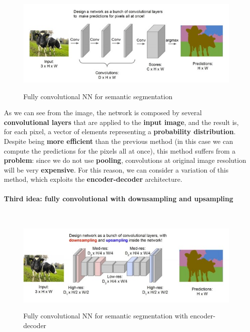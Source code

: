 \begin{figure}[h!]
		\centering
        \includegraphics[scale = 2.0]{img/semantic2.jpg}
		\label{semantic2}
        \caption{Fully convolutional NN for semantic segmentation}
\end{figure}

As we can see from the image, the network is composed by several \textbf{convolutional layers} that are applied to the \textbf{input image}, and the result is, for each pixel, a vector of elements representing a \textbf{probability distribution}. Despite being \textbf{more efficient} than the previous method (in this case we can compute the predictions for the pixels all at once), this method suffers from a \textbf{problem}: since we do not use \textbf{pooling}, convolutions at original image resolution will be very \textbf{expensive}. For this reason, we can consider a variation of this method, which exploits the \textbf{encoder-decoder} architecture.

\paragraph{Third idea: fully convolutional with downsampling and upsampling}
\\

\begin{figure}[h!]
		\centering
        \includegraphics[scale = 2.0]{img/semantic3.jpg}
		\label{semantic2}
        \caption{Fully convolutional NN for semantic segmentation with encoder-decoder}
\end{figure}

